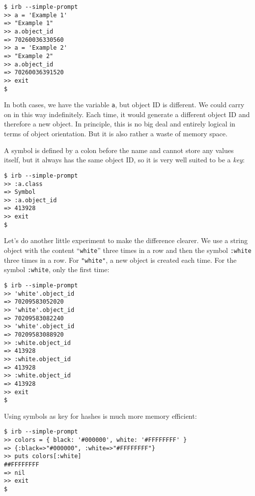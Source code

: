 \documentclass[a4paper]{book}
\begin{document}
\begin{shaded}\begin{verbatim}
$ irb --simple-prompt
>> a = 'Example 1'
=> "Example 1"
>> a.object_id
=> 70260036330560
>> a = 'Example 2'
=> "Example 2"
>> a.object_id
=> 70260036391520
>> exit
$
\end{verbatim}\end{shaded}

In both cases, we have the variable \texttt{a}, but object ID is different. We could carry on in this way indefinitely. Each time, it would generate a different object ID and therefore a new object. In principle, this is no big deal and entirely logical in terms of object orientation. But it is also rather a waste of memory space.

A symbol is defined by a colon before the name and cannot store any values itself, but it always has the same object ID, so it is very well suited to be a \emph{key}:

\begin{shaded}\begin{verbatim}
$ irb --simple-prompt
>> :a.class
=> Symbol
>> :a.object_id
=> 413928
>> exit
$
\end{verbatim}\end{shaded}

Let's do another little experiment to make the difference clearer. We use a string object with the content “\texttt{white}” three times in a row and then the symbol \texttt{:white} three times in a row. For \texttt{"white"}, a new object is created each time. For the symbol \texttt{:white}, only the first time:

\begin{shaded}\begin{verbatim}
$ irb --simple-prompt
>> 'white'.object_id
=> 70209583052020
>> 'white'.object_id
=> 70209583082240
>> 'white'.object_id
=> 70209583088920
>> :white.object_id
=> 413928
>> :white.object_id
=> 413928
>> :white.object_id
=> 413928
>> exit
$
\end{verbatim}\end{shaded}

Using symbols as key for hashes is much more memory efficient:

\begin{shaded}\begin{verbatim}
$ irb --simple-prompt
>> colors = { black: '#000000', white: '#FFFFFFFF' }
=> {:black=>"#000000", :white=>"#FFFFFFFF"}
>> puts colors[:white]
##FFFFFFFF
=> nil
>> exit
$
\end{verbatim}\end{shaded}
\end{document}
